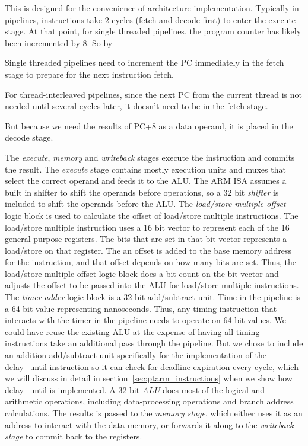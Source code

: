 This is designed for the convenience of architecture implementation.
Typically in pipelines, instructions take 2 cycles (fetch and decode first) to enter the execute stage. 
At that point, for single threaded pipelines, the program counter has likely been incremented by 8. 
So by    


Single threaded pipelines need to increment the PC immediately in the fetch stage to prepare for the next instruction fetch.  

For thread-interleaved pipelines, since the next PC from the current thread is not needed until several cycles later, it doesn't need to be in the fetch stage. 

But because we need the results of PC+8 as a data operand, it is placed in the decode stage. 

The \emph{execute}, \emph{memory} and \emph{writeback} stages execute the instruction and commits the result. 
The \emph{execute} stage contains mostly execution units and muxes that select the correct operand and feeds it to the ALU.  
The ARM ISA assumes a built in shifter to shift the operands before operations, so a 32 bit \emph{shifter} is included to shift the operands before the ALU.   
The \emph{load/store multiple offset} logic block is used to calculate the offset of load/store multiple instructions.
The load/store multiple instruction uses a 16 bit vector to represent each of the 16 general purpose registers.
The bits that are set in that bit vector represents a load/store on that register.
The an offset is added to the base memory address for the instruction, and that offset depends on how many bits are set. 
Thus, the load/store multiple offset logic block does a bit count on the bit vector and adjusts the offset to be passed into the ALU for load/store multiple instructions.
The \emph{timer adder} logic block is a 32 bit add/subtract unit.
Time in the pipeline is a 64 bit value representing nanoseconds. 
Thus, any timing instruction that interacts with the timer in the pipeline needs to operate on 64 bit values.
We could have reuse the existing ALU at the expense of having all timing instructions take an additional pass through the pipeline.
But we chose to include an addition add/subtract unit specifically for the implementation of the delay\_until instruction so it can check for deadline expiration every cycle, which we will discuss in detail in section~\ref{sec:ptarm_instructions} when we show how delay\_until is implemented.    
A 32 bit \emph{ALU} does most of the logical and arithmetic operations, including data-processing operations and branch address calculations.
The results is passed to the \emph{memory stage}, which either uses it as an address to interact with the data memory, or forwards it along to the \emph{writeback stage} to commit back to the registers.

